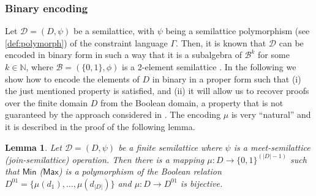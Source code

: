 \documentclass[11pt]{article}
\newcommand{\Max}{\textsf{Max}}
\newcommand{\Min}{\textsf{Min}}
\newcommand{\1}{\textbf{1}}
\newcommand\uval{{(|D|-1)}}
\newtheorem{lemma}[theorem]{Lemma}
\begin{document}
\subsubsection{Binary encoding}\label{sect:binencoding}
{Let} $\mathcal{D} = (D,\psi)$ {be} a semilattice{, with} $\psi$ {being} a semilattice polymorphism (see \cref{def:polymorph}) of the constraint language $\Gamma$.
Then, it is known that $\mathcal{D}$ can be encoded in binary form in such a way that it is a subalgebra of $\mathcal{B}^k$ {for some $k \in \mathbb{N}$}, where $\mathcal{B} = (\{0, 1\}, \phi)$ is a 2-element semilattice \cite{DonaPapert1964}.
%
In the following we show how to encode the elements of $D$ in binary in a proper form such that (i) the just mentioned property \cite{DonaPapert1964} is satisfied, and (ii) it will allow us to recover proofs {over the finite domain $D$} from the Boolean domain, a property that is not guaranteed by the approach considered in \cite{BulatovRSTOC22}.
The encoding $\mu$ is very ``natural'' and it is described in the proof of the following lemma.%
%
%
\begin{lemma}\label{th:bin_encoding}
    Let $\mathcal{D} = (D,\psi)$ be a finite semilattice where $\psi$ is a meet-semilattice (join-semilattice) operation. Then there is a mapping $\mu:D\rightarrow \{0,1\}^{\uval}$ such that $\Min$ ($\Max$) is a polymorphism of {the Boolean relation} $D^{01}=\{\mu(d_1),\ldots,\mu(d_{|D|})\}$ and $\mu:D\rightarrow D^{01}$ is bijective.
\end{lemma}
\end{document}
